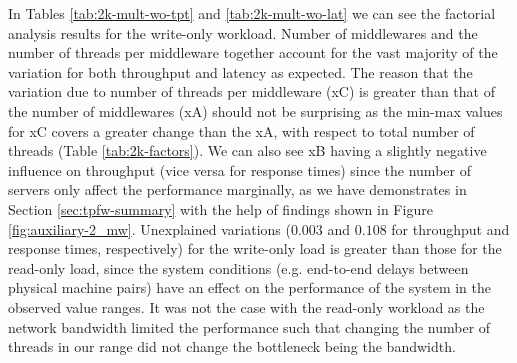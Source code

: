 \documentclass[11pt,a4paper]{article}
\begin{document}
\par In Tables \ref{tab:2k-mult-wo-tpt} and \ref{tab:2k-mult-wo-lat} we can see the factorial analysis results for the write-only workload. Number of middlewares and the number of threads per middleware together account for the vast majority of the variation for both throughput and latency as expected. The reason that the variation due to number of threads per middleware (xC) is greater than that of the number of middlewares (xA) should not be surprising as the min-max values for xC covers a greater change than the xA, with respect to total number of threads (Table \ref{tab:2k-factors}). We can also see xB having a slightly negative influence on throughput (vice versa for response times) since the number of servers only affect the performance marginally, as we have demonstrates in Section \ref{sec:tpfw-summary} with the help of findings shown in Figure \ref{fig:auxiliary-2_mw}. Unexplained variations ($0.003$ and $0.108$ for throughput and response times, respectively) for the write-only load is greater than those for the read-only load, since the system conditions (e.g. end-to-end delays between physical machine pairs) have an effect on the performance of the system in the observed value ranges. It was not the case with the read-only workload as the network bandwidth limited the performance such that changing the number of threads in our range did not change the bottleneck being the bandwidth.
\end{document}
